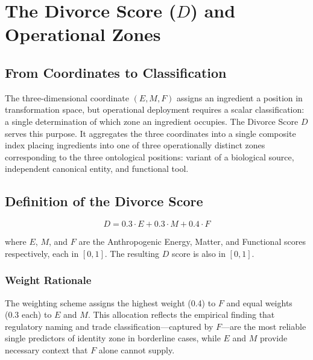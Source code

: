 \documentclass[12pt,a3paper]{article}
\begin{document}
\newpage


\section{The Divorce Score ($D$) and Operational Zones}
\label{ch:divorce}

\subsection{From Coordinates to Classification}

The three-dimensional coordinate $(E, M, F)$ assigns an ingredient a position in transformation space, but operational deployment requires a scalar classification: a single determination of which zone an ingredient occupies. The Divorce Score $D$ serves this purpose. It aggregates the three coordinates into a single composite index placing ingredients into one of three operationally distinct zones corresponding to the three ontological positions: variant of a biological source, independent canonical entity, and functional tool.

\subsection{Definition of the Divorce Score}

\begin{equation}
D = 0.3 \cdot E + 0.3 \cdot M + 0.4 \cdot F
\label{eq:divorce}
\end{equation}

where $E$, $M$, and $F$ are the Anthropogenic Energy, Matter, and Functional scores respectively, each in $[0, 1]$. The resulting $D$ score is also in $[0, 1]$.

\subsubsection{Weight Rationale}

The weighting scheme assigns the highest weight (0.4) to $F$ and equal weights (0.3 each) to $E$ and $M$. This allocation reflects the empirical finding that regulatory naming and trade classification---captured by $F$---are the most reliable single predictors of identity zone in borderline cases, while $E$ and $M$ provide necessary context that $F$ alone cannot supply.
\end{document}
